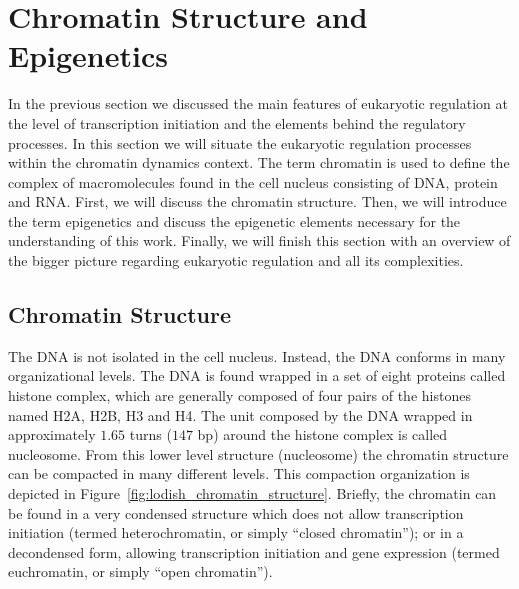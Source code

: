 \section{Chromatin Structure and Epigenetics}
\label{sec:chromatin.epigenetics}

In the previous section we discussed the main features of eukaryotic regulation at the level of transcription initiation and the elements behind the regulatory processes. In this section we will situate the eukaryotic regulation processes within the chromatin dynamics context. The term chromatin is used to define the complex of macromolecules found in the cell nucleus consisting of DNA, protein and RNA. First, we will discuss the chromatin structure. Then, we will introduce the term epigenetics and discuss the epigenetic elements necessary for the understanding of this work. Finally, we will finish this section with an overview of the bigger picture regarding eukaryotic regulation and all its complexities.

\subsection{Chromatin Structure}
\label{sec:chromatin.structure}

The DNA is not isolated in the cell nucleus. Instead, the DNA conforms in many organizational levels. The DNA is found wrapped in a set of eight proteins called histone complex, which are generally composed of four pairs of the histones named H2A, H2B, H3 and H4. The unit composed by the DNA wrapped in approximately $1.65$ turns (\approxy$147$ bp) around the histone complex is called nucleosome. From this lower level structure (nucleosome) the chromatin structure can be compacted in many different levels. This compaction organization is depicted in Figure~\ref{fig:lodish_chromatin_structure}. Briefly, the chromatin can be found in a very condensed structure which does not allow transcription initiation (termed heterochromatin, or simply ``closed chromatin''); or in a decondensed form, allowing transcription initiation and gene expression (termed euchromatin, or simply ``open chromatin'').

